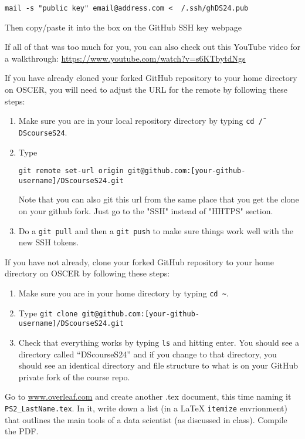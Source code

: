 \documentclass[12pt,english]{exam}
\begin{document}
\begin{questions}
\begin{enumerate}
\begin{itemize}
        \texttt{mail -s "public key" email@address.com < ~/.ssh/ghDS24.pub}

        Then copy/paste it into the box on the GitHub SSH key webpage
    \end{itemize}
\end{enumerate}

    If all of that was too much for you, you can also check out this YouTube video for a walkthrough: \url{https://www.youtube.com/watch?v=s6KTbytdNgs}

\question If you have already cloned your forked GitHub repository to your home directory on OSCER, you will need to adjust the URL for the remote by following these steps:
\begin{enumerate}
    \item Make sure you are in your local repository directory by typing \texttt{cd \~/DScourseS24}.
    \item Type 
        
        \texttt{git remote set-url origin git@github.com:[your-github-username]/DScourseS24.git}

        Note that you can also git this url from the same place that you get the clone on your github fork. Just go to the "SSH" instead of "HHTPS" section.
    \item Do a \texttt{git pull} and then a \texttt{git push} to make sure things work well with the new SSH tokens.
\end{enumerate}

\question If you have not already, clone your forked GitHub repository to your home directory on OSCER by following these steps:
\begin{enumerate}
    \item Make sure you are in your home directory by typing \texttt{cd \~}.
    \item Type \texttt{git clone git@github.com:[your-github-username]/DScourseS24.git}
    \item Check that everything works by typing \texttt{ls} and hitting enter. You should see a directory called ``DScourseS24'' and if you change to that directory, you should see an identical directory and file structure to what is on your GitHub private fork of the course repo.
\end{enumerate}

\question Go to \url{www.overleaf.com} and create another .tex document, this time naming it \texttt{PS2\_LastName.tex}. In it, write down a list (in a LaTeX \texttt{itemize} envrionment) that outlines the main tools of a data scientist (as discussed in class). Compile the PDF.


\end{questions}
\end{document}
